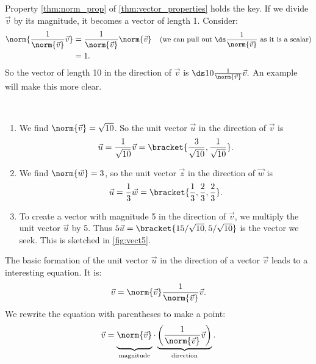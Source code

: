 Property \ref{thm:norm_prop} of \autoref{thm:vector_properties} holds the key. If we divide $\vec v$ by its magnitude, it becomes a vector of length 1. Consider:
\begin{align*}
	\norm{\frac{1}{\norm{\vec v}}\vec v}
	&= \frac{1}{\norm{\vec v}}\norm{\vec v}
	& \text{\small (we can pull out $\ds \frac{1}{\norm{\vec v}}$ as it is a scalar)}\\
	&= 1.
\end{align*}			
So the vector of length 10 in the direction of $\vec v$ is $\ds 10\frac{1}{\norm{\vec v}}\vec v.$ An example will make this more clear.

{\mbox{}\\[-\baselineskip]\begin{enumerate}
	\item	We find $\norm{\vec v} = \sqrt{10}$. So the unit vector $\vec u$ in the direction of $\vec v$ is $$\vec u = \frac{1}{\sqrt{10}}\vec v =\bracket{\frac{3}{\sqrt{10}},\frac{1}{\sqrt{10}}}.$$
	\item	We find $\norm{\vec w} = 3$, so the unit vector $\vec z$ in the direction of $\vec w$ is
	$$\vec u = \frac13\vec w =\bracket{\frac13,\frac23,\frac23}.$$
	\item	To create a vector with magnitude 5 in the direction of $\vec v$, we multiply the unit vector $\vec u$ by 5. Thus $5\vec u =\bracket{15/\sqrt{10},5/\sqrt{10}}$ is the vector we seek. This is sketched in \autoref{fig:vect5}.\eoehere
\end{enumerate}}

The basic formation of the unit vector $\vec u$ in the direction of a vector $\vec v$ leads to a interesting equation. It is:
$$\vec v = \norm{\vec v}\frac{1}{\norm{\vec v}}\vec v.$$
We rewrite the equation with parentheses to make a point:
$$\vec v = \underbrace{\rule[-9.5pt]{0pt}{15pt}\norm{\vec v}}_{\text{\scriptsize magnitude}}\cdot\underbrace{\left(\frac{1}{\norm{\vec v}}\vec v\right)}_{\text{\scriptsize direction}}.$$

